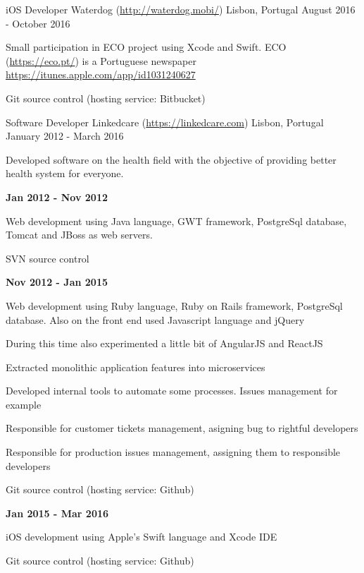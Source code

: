 \begin{cventries}
  \cventry
	{iOS Developer} %
    {Waterdog (\url{http://waterdog.mobi/}) } %
    {Lisbon, Portugal} %
    {August 2016 - October 2016} %
    {
	\begin{cvitems} %
		\item {Small participation in ECO project using Xcode and Swift. ECO (\url{https://eco.pt/}) is a Portuguese newspaper\\}
		\url{https://itunes.apple.com/app/id1031240627}
		\item {Git source control (hosting service: Bitbucket)}
	\end{cvitems}
}

  \cventry
	{Software Developer} %
    {Linkedcare (\url{https://linkedcare.com}) } %
	{Lisbon, Portugal} %
	{January 2012 - March 2016} %
	{
	 \begin{cvitems} %
	 	\item {Developed software on the health field with the objective of providing better health system for everyone.}
	 	\item{\textbf{Jan 2012 - Nov 2012}}
	 	\item{Web development using Java language, GWT framework, PostgreSql database, Tomcat and JBoss as web servers.}
	 	\item {SVN source control}
	 	\item{\textbf{Nov 2012 - Jan 2015}}
	 	\item{Web development using Ruby language, Ruby on Rails framework, PostgreSql database. Also on the front end used Javascript language and jQuery}
	 	\item{During this time also experimented a little bit of AngularJS and ReactJS}
	 	\item{Extracted monolithic application features into microservices}
	 	\item{Developed internal tools to automate some processes. Issues management for example}
	 	\item{Responsible for customer tickets management, asigning bug to rightful developers}
	 	\item{Responsible for production issues management, assigning them to responsible developers}
	 	\item {Git source control (hosting service: Github)}
	 	\item{\textbf{Jan 2015 - Mar 2016}}
	 	\item{iOS development using Apple's Swift language and Xcode IDE}
	 	\item {Git source control (hosting service: Github)}
	\end{cvitems}
	}


\end{cventries}
